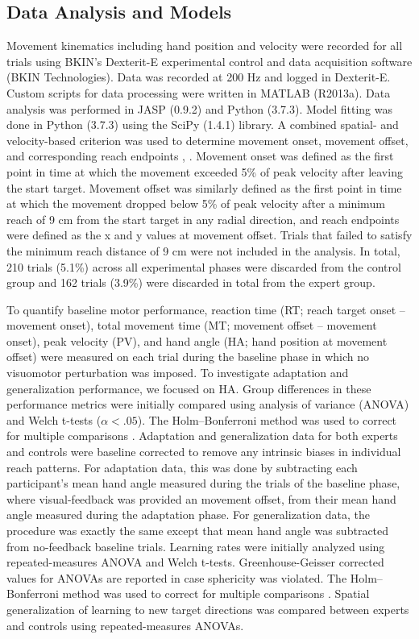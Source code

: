 \documentclass[man, 11pt, longtable, floatsintext, notab]{apa6}
\begin{document}
\subsection{Data Analysis and Models}
Movement kinematics including hand position and velocity
were recorded for all trials using BKIN’s Dexterit-E
experimental control and data acquisition software (BKIN
Technologies). Data was recorded at 200 Hz and logged in
Dexterit-E. Custom scripts for data processing were written
in MATLAB (R2013a). Data analysis was performed in JASP
(0.9.2) and Python (3.7.3). Model fitting was done in Python
(3.7.3) using the SciPy (1.4.1) library. A combined spatial-
and velocity-based criterion was used to determine movement
onset, movement offset, and corresponding reach endpoints
\cite{georgopoulos_relations_1982},
\cite{scott_dissociation_2001}. Movement onset was defined
as the first point in time at which the movement exceeded
5\% of peak velocity after leaving the start target.
Movement offset was similarly defined as the first point in
time at which the movement dropped below 5\% of peak
velocity after a minimum reach of 9 cm from the start target
in any radial direction, and reach endpoints were defined as
the x and y values at movement offset. Trials that failed to
satisfy the minimum reach distance of 9 cm were not included
in the analysis. In total, 210 trials (5.1\%) across all
experimental phases were discarded from the control group
and 162 trials (3.9\%) were discarded in total from the
expert group.

To quantify baseline motor performance, reaction time (RT;
reach target onset – movement onset), total movement time
(MT; movement offset – movement onset), peak velocity (PV),
and hand angle (HA; hand position at movement offset) were
measured on each trial during the baseline phase in which no
visuomotor perturbation was imposed. To investigate
adaptation and generalization performance, we focused on HA.
Group differences in these performance metrics were
initially compared using analysis of variance (ANOVA) and
Welch t-tests ($\alpha < .05$). The Holm–Bonferroni method
was used to correct for multiple comparisons
\cite{holm_simple_1979}. Adaptation and generalization data
for both experts and controls were baseline corrected to
remove any intrinsic biases in individual reach patterns.
For adaptation data, this was done by subtracting each
participant’s mean hand angle measured during the trials of
the baseline phase, where visual-feedback was provided an
movement offset, from their mean hand angle measured during
the adaptation phase. For generalization data, the procedure
was exactly the same except that mean hand angle was
subtracted from no-feedback baseline trials. Learning rates
were initially analyzed using repeated-measures ANOVA and
Welch t-tests. Greenhouse-Geisser corrected values for
ANOVAs are reported in case sphericity was violated. The
Holm–Bonferroni method was used to correct for multiple
comparisons \cite{holm_simple_1979}. Spatial generalization
of learning to new target directions was compared between
experts and controls using repeated-measures ANOVAs.
\end{document}
